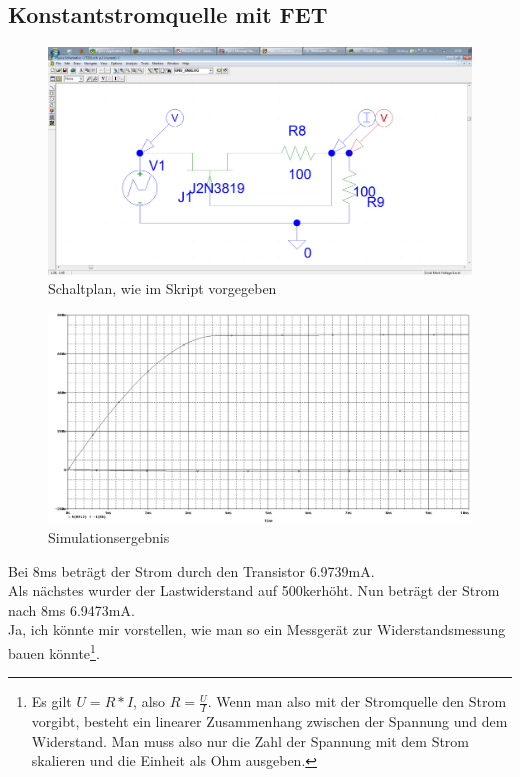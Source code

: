 \subsection{Konstantstromquelle mit FET}
\begin{figure}[H]
	\centering
	\includegraphics[width=\linewidth]{versuch7/spice/s7211.png}
	\caption{Schaltplan, wie im Skript vorgegeben}
\end{figure}
\begin{figure}[H]
	\centering
	\includegraphics[width=\linewidth]{versuch7/spice/7212.png}
	\caption{Simulationsergebnis}
\end{figure}
Bei 8ms beträgt der Strom durch den Transistor 6.9739mA.\\
Als nächstes wurder der Lastwiderstand auf 500k\Ohm erhöht. Nun beträgt der Strom nach 8ms 6.9473mA.\\
Ja, ich könnte mir vorstellen, wie man so ein Messgerät zur Widerstandsmessung bauen könnte\footnote{Es gilt $ U=R*I $, also $ R=\frac{U}{I} $. Wenn man also mit der Stromquelle den Strom vorgibt, besteht ein linearer Zusammenhang zwischen der Spannung und dem Widerstand. Man muss also nur die Zahl der Spannung mit dem Strom skalieren und die Einheit als Ohm ausgeben.}.


